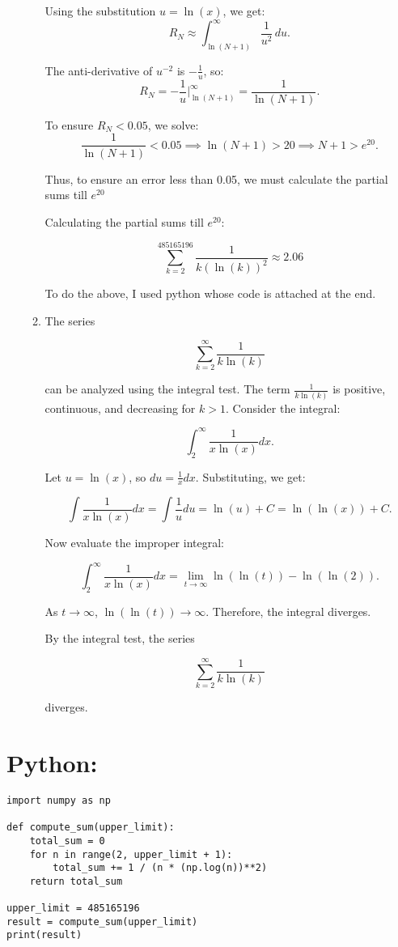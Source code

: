 \documentclass[12pt]{article}
\begin{document}
\begin{enumerate}
\begin{enumerate}
Using the substitution \(u = \ln(x)\), we get:
\[
R_N \approx \int_{\ln(N+1)}^\infty \frac{1}{u^2} \, du.
\]

The anti-derivative of \(u^{-2}\) is \(-\frac{1}{u}\), so:
\[
R_N = -\frac{1}{u} \Big|_{\ln(N+1)}^\infty = \frac{1}{\ln(N+1)}.
\]

To ensure \(R_N < 0.05\), we solve:
\[
\frac{1}{\ln(N+1)} < 0.05 \implies \ln(N+1) > 20 \implies N+1 > e^{20}.
\]

Thus, to ensure an error less than 0.05, we must calculate the partial sums till \(e^{20}\)

Calculating the partial sums till $e^{20}$:

\[
\sum_{k = 2}^{485165196} \frac{1}{k (\ln(k))^2} \approx 2.06
\]

To do the above, I used python whose code is attached at the end.

\item 
The series 

\[
\sum_{k=2}^\infty \frac{1}{k \ln(k)}
\]

can be analyzed using the integral test. The term \(\frac{1}{k \ln(k)}\) is positive, continuous, and decreasing for \(k > 1\). Consider the integral:

\[
\int_{2}^\infty \frac{1}{x \ln(x)} dx.
\]

Let \( u = \ln(x) \), so \( du = \frac{1}{x} dx \). Substituting, we get:

\[
\int \frac{1}{x \ln(x)} dx = \int \frac{1}{u} du = \ln(u) + C = \ln(\ln(x)) + C.
\]

Now evaluate the improper integral:

\[
\int_{2}^\infty \frac{1}{x \ln(x)} dx = \lim_{t \to \infty} \ln(\ln(t)) - \ln(\ln(2)).
\]

As \( t \to \infty \), \(\ln(\ln(t)) \to \infty\). Therefore, the integral diverges.

By the integral test, the series 

\[
\sum_{k=2}^\infty \frac{1}{k \ln(k)}
\]

diverges.

\end{enumerate}

\end{enumerate}

\section*{Python:}
\begin{lstlisting}
import numpy as np

def compute_sum(upper_limit):
    total_sum = 0
    for n in range(2, upper_limit + 1):
        total_sum += 1 / (n * (np.log(n))**2)
    return total_sum

upper_limit = 485165196
result = compute_sum(upper_limit)
print(result)
\end{lstlisting}
\end{document}

